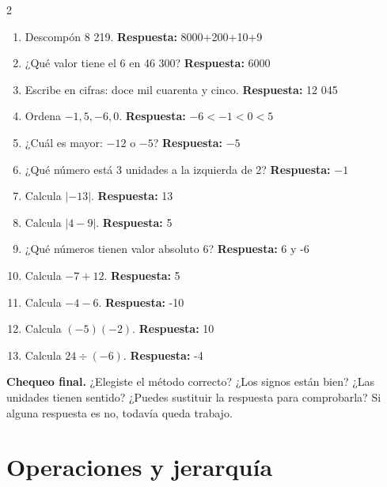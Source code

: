 \documentclass[10pt,oneside,openany]{book}
\begin{document}
\begin{multicols}{2}\begin{enumerate}

\item Descompón 8 219. \textbf{Respuesta:} 8000+200+10+9

\item ¿Qué valor tiene el 6 en 46 300? \textbf{Respuesta:} 6000

\item Escribe en cifras: doce mil cuarenta y cinco. \textbf{Respuesta:} 12 045

\item Ordena $-1, 5, -6, 0$. \textbf{Respuesta:} $-6<-1<0<5$

\item ¿Cuál es mayor: $-12$ o $-5$? \textbf{Respuesta:} $-5$

\item ¿Qué número está 3 unidades a la izquierda de 2? \textbf{Respuesta:} $-1$

\item Calcula $|-13|$. \textbf{Respuesta:} 13

\item Calcula $|4-9|$. \textbf{Respuesta:} 5

\item ¿Qué números tienen valor absoluto 6? \textbf{Respuesta:} 6 y -6

\item Calcula $-7+12$. \textbf{Respuesta:} 5

\item Calcula $-4-6$. \textbf{Respuesta:} -10

\item Calcula $(-5)(-2)$. \textbf{Respuesta:} 10

\item Calcula $24\div(-6)$. \textbf{Respuesta:} -4

\end{enumerate}\end{multicols}

\begin{idea}\textbf{Chequeo final.} ¿Elegiste el método correcto? ¿Los signos están bien? ¿Las unidades tienen sentido? ¿Puedes sustituir la respuesta para comprobarla? Si alguna respuesta es no, todavía queda trabajo.\end{idea}



\chapter{Operaciones y jerarquía}
\end{document}
